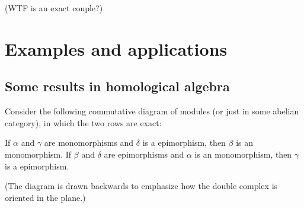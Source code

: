 \documentclass[10pt]{article}
\begin{document}
(WTF is an exact couple?)

\section{Examples and applications}

\subsection{Some results in homological algebra}
\begin{prop}
    \label{prop:four-lemmas}
    Consider the following commutative diagram
    of modules (or just in some abelian category),
    in which the two rows are exact:
    \begin{center}
    \end{center}
    \begin{enumerate}[(a)]
        \ii If $\alpha$ and $\gamma$ are monomorphisms
	and $\delta$ is a epimorphism, then $\beta$ is an monomorphism.
	\ii If $\beta$ and $\delta$ are epimorphisms
	and $\alpha$ is an monomorphism, then $\gamma$ is a epimorphism.
    \end{enumerate}
    (The diagram is drawn backwards to emphasize
    how the double complex is oriented in the plane.)
\end{prop}
\end{document}
